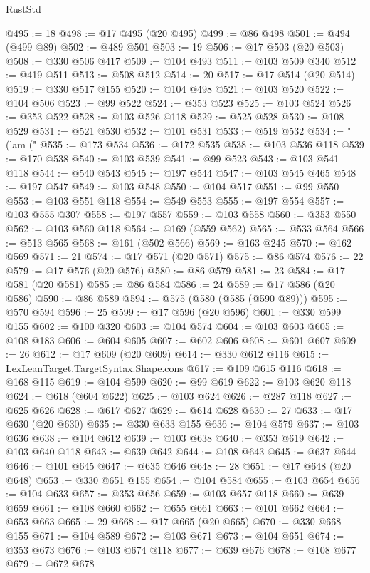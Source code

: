 \begin{lexlean}{RustStd}
\begin{coremodule}
{\begin{coremodule}
{{{{{{{{{{{{{{{{{{{{{{{{{{@495 := 18
@498 := @17 @495 (@20 @495)
@499 := @86 @498
@501 := @494 (@499 @89)
@502 := @489 @501
@503 := 19
@506 := @17 @503 (@20 @503)
@508 := @330 @506 @417
@509 := @104 @493
@511 := @103 @509 @340
@512 := @419 @511
@513 := @508 @512
@514 := 20
@517 := @17 @514 (@20 @514)
@519 := @330 @517 @155
@520 := @104 @498
@521 := @103 @520
@522 := @104 @506
@523 := @99 @522
@524 := @353 @523
@525 := @103 @524
@526 := @353 @522
@528 := @103 @526 @118
@529 := @525 @528
@530 := @108 @529
@531 := @521 @530
@532 := @101 @531
@533 := @519 @532
@534 := "(lam ("
@535 := @173 @534
@536 := @172 @535
@538 := @103 @536 @118
@539 := @170 @538
@540 := @103 @539
@541 := @99 @523
@543 := @103 @541 @118
@544 := @540 @543
@545 := @197 @544
@547 := @103 @545 @465
@548 := @197 @547
@549 := @103 @548
@550 := @104 @517
@551 := @99 @550
@553 := @103 @551 @118
@554 := @549 @553
@555 := @197 @554
@557 := @103 @555 @307
@558 := @197 @557
@559 := @103 @558
@560 := @353 @550
@562 := @103 @560 @118
@564 := @169 (@559 @562)
@565 := @533 @564
@566 := @513 @565
@568 := @161 (@502 @566)
@569 := @163 @245
@570 := @162 @569
@571 := 21
@574 := @17 @571 (@20 @571)
@575 := @86 @574
@576 := 22
@579 := @17 @576 (@20 @576)
@580 := @86 @579
@581 := 23
@584 := @17 @581 (@20 @581)
@585 := @86 @584
@586 := 24
@589 := @17 @586 (@20 @586)
@590 := @86 @589
@594 := @575 (@580 (@585 (@590 @89)))
@595 := @570 @594
@596 := 25
@599 := @17 @596 (@20 @596)
@601 := @330 @599 @155
@602 := @100 @320
@603 := @104 @574
@604 := @103 @603
@605 := @108 @183
@606 := @604 @605
@607 := @602 @606
@608 := @601 @607
@609 := 26
@612 := @17 @609 (@20 @609)
@614 := @330 @612 @116
@615 := LexLeanTarget.TargetSyntax.Shape.cons
@617 := @109 @615 @116
@618 := @168 @115
@619 := @104 @599
@620 := @99 @619
@622 := @103 @620 @118
@624 := @618 (@604 @622)
@625 := @103 @624
@626 := @287 @118
@627 := @625 @626
@628 := @617 @627
@629 := @614 @628
@630 := 27
@633 := @17 @630 (@20 @630)
@635 := @330 @633 @155
@636 := @104 @579
@637 := @103 @636
@638 := @104 @612
@639 := @103 @638
@640 := @353 @619
@642 := @103 @640 @118
@643 := @639 @642
@644 := @108 @643
@645 := @637 @644
@646 := @101 @645
@647 := @635 @646
@648 := 28
@651 := @17 @648 (@20 @648)
@653 := @330 @651 @155
@654 := @104 @584
@655 := @103 @654
@656 := @104 @633
@657 := @353 @656
@659 := @103 @657 @118
@660 := @639 @659
@661 := @108 @660
@662 := @655 @661
@663 := @101 @662
@664 := @653 @663
@665 := 29
@668 := @17 @665 (@20 @665)
@670 := @330 @668 @155
@671 := @104 @589
@672 := @103 @671
@673 := @104 @651
@674 := @353 @673
@676 := @103 @674 @118
@677 := @639 @676
@678 := @108 @677
@679 := @672 @678
}}}}}}}}}}}}}}}}}}}}}}}}}}
\end{coremodule}}
\end{coremodule}
\end{lexlean}

